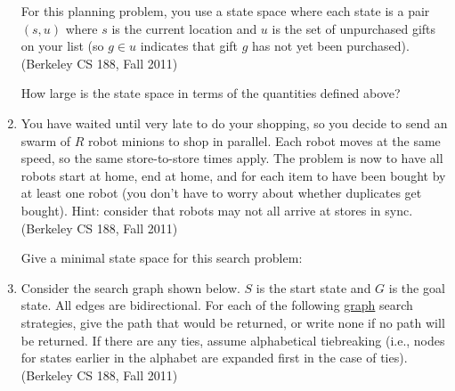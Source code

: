 \documentclass[11pt]{article}
\begin{document}
\begin{enumerate}
For this planning problem, you use a state space where each state is a pair
$(s,u)$ where $s$ is the current location and $u$ is the set of unpurchased
gifts on your list (so $g \in u$ indicates that gift $g$ has not yet been purchased).
(Berkeley CS 188, Fall 2011)

How large is the state space in terms of the quantities defined above?

\bigskip \bigskip \bigskip \bigskip
\bigskip \bigskip \bigskip \bigskip
\bigskip \bigskip \bigskip \bigskip

\item You have waited until very late to do your shopping, so you decide to send an swarm of
$R$ robot minions to
shop in parallel.  Each robot moves at the same speed, so the same
store-to-store times apply.  The problem
is now to have all robots start at home, end at home, and for each item
to have been bought by at least one
robot (you don’t have to worry about whether duplicates get bought).
Hint:  consider that robots may not all
arrive at stores in sync. (Berkeley CS 188, Fall 2011)

Give a minimal state space for this search problem:

\newpage

\item Consider the search graph shown below.
$S$ is the start state and $G$ is the goal state. All edges are bidirectional. For each of the following \underline{graph} search strategies, give the path that would be returned, or write none if no path will be returned. If there are any ties, assume alphabetical tiebreaking (i.e., nodes for states earlier in the alphabet are expanded first in the case of ties). \\(Berkeley CS 188, Fall 2011)


\end{enumerate}
\end{document}
